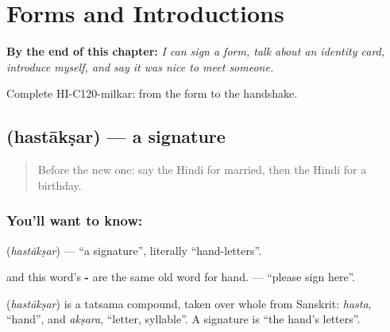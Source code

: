 
\chapter{Forms and Introductions}
\label{ch:hi-forms-and-introductions}

\begin{chapteropening}
\textbf{By the end of this chapter:} \emph{I can sign a form, talk about an identity card, introduce myself, and say it was nice to meet someone.}

Complete HI-C120-milkar: from the form to the handshake.
\end{chapteropening}

\section[\texorpdfstring{\hi{हस्ताक्षर} (hastākṣar)}{हस्ताक्षर (hastākṣar)}]{ (hastākṣar) — a signature}

\label{lesson:HI-C120-hastakshar}



\begin{quote}
Before the new one: say the Hindi for married, then the Hindi for a birthday.
\end{quote}

\subsection*{You'll want to know: }
\textbf{} (\emph{hastākṣar}) — \textquotedblleft{}a signature\textquotedblright{}, literally \textquotedblleft{}hand-letters\textquotedblright{}.

\textbf{} and this word's \textbf{-} are the same old word for hand. \textbf{  } — \textquotedblleft{}please sign here\textquotedblright{}.

\begin{cousinweb}
\textbf{} (\emph{hastākṣar}) is a tatsama compound, taken over whole from Sanskrit: \emph{hasta}, \textquotedblleft{}hand\textquotedblright{}, and \emph{akṣara}, \textquotedblleft{}letter, syllable\textquotedblright{}. A signature is \textquotedblleft{}the hand's letters\textquotedblright{}.
\end{cousinweb}

